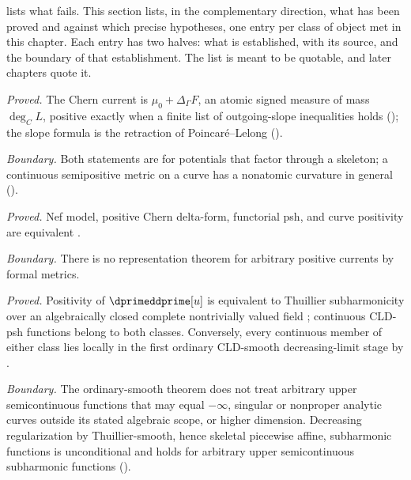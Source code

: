  lists what fails.  This section lists, in the
complementary direction, what has been proved and against which precise
hypotheses, one entry per class of object met in this chapter.  Each entry
has two halves: what is established, with its source, and the boundary of
that establishment.  The list is meant to be quotable, and later chapters
quote it.

\begin{description}[style=nextline,leftmargin=0pt,labelindent=0pt,
  labelsep=0pt,itemsep=.8\baselineskip,font=\normalfont\bfseries]
\item[Model metric on a curve]
\emph{Proved.} The Chern current is $\mu_0+\Delta_\Gamma F$, an atomic
signed measure of mass $\deg_CL$, positive exactly when a finite list of
outgoing-slope inequalities holds
(); the slope formula is the
retraction of Poincar\'e--Lelong
().
\par\emph{Boundary.} Both statements are for potentials that factor through
a skeleton; a continuous semipositive metric on a curve has a nonatomic
curvature in general ().

\item[Formal metric on a proper algebraic variety]
\emph{Proved.} Nef model, positive Chern delta-form, functorial psh, and curve
positivity are equivalent \cite[Theorem~6.10]{GK19}.
\par\emph{Boundary.} There is no representation theorem for arbitrary
positive currents by formal metrics.

\item[Continuous function on a smooth proper curve]
\emph{Proved.} Positivity of $\dprimeddprime[u]$ is equivalent to
Thuillier subharmonicity \cite[Def.~3.1.5]{Thu05} over an algebraically
closed complete nontrivially valued field
\cite[Theorem~4.7 and Corollary~4.8]{Wanner19}; continuous CLD-psh functions
belong to both classes.  Conversely, every continuous member of either class
lies locally in the first ordinary CLD-smooth decreasing-limit stage by
.
\par\emph{Boundary.} The ordinary-smooth theorem does not treat arbitrary
upper semicontinuous functions that may equal $-\infty$, singular or
nonproper analytic curves outside its stated algebraic scope, or higher
dimension.  Decreasing regularization by Thuillier-smooth, hence skeletal
piecewise affine, subharmonic functions is unconditional and holds for
arbitrary upper semicontinuous subharmonic functions
().


\end{description}
